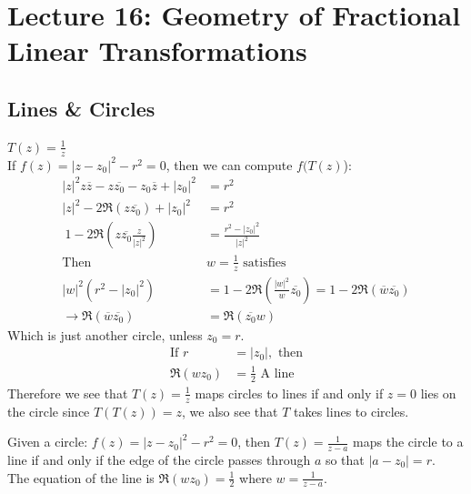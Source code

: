 \chapter{Lecture 16: Geometry of Fractional Linear Transformations}

\section{Lines \& Circles}

\begin{example}
    $T(z) = \frac{1}z$\\
    If $f(z) = |z-z_0|^2 - r^2 = 0$, then we can compute $f(T(z)$):
    \begin{align*}
        |z|^2 z\overline{z} - z\overline{z_0} - z_0\overline{z} + |z_0|^2 & = r^2                                                                            \\
        |z|^2 - 2\Re(z\overline{z_0}) + |z_0|^2                           & = r^2                                                                            \\\
        1 - 2\Re(z\overline{z_0}\frac{z}{|z|^2})                          & = \frac{r^2 - |z_0|^2}{|z|^2}                                                    \\
        \text{Then }                                                      & w = \frac{1}z \text{ satisfies}                                                  \\
        |w|^2(r^2 - |z_0|^2)                                              & = 1 - 2\Re(\frac{|w|^2}{w}\overline{z_0}) = 1 - 2\Re(\overline{w}\overline{z_0}) \\
        \rightarrow \Re(\overline{w}\overline{z_0})                       & = \Re(\overline{z_0}w)\end{align*}
    Which is just another circle, unless $z_0 = r$.
    \begin{align*}
        \text{If } r & = |z_0|, \text{ then}      \\
        \Re(wz_0)    & = \frac{1}2 \text{ A line}
    \end{align*}
    Therefore we see that $T(z) = \frac{1}z$ maps circles to lines if and only if $z = 0$ lies on the circle since $T(T(z)) = z$, we also see that $T$ takes lines to circles.
\end{example}

\begin{proposition}
    Given a circle: $f(z) = |z-z_0|^2 - r^2 = 0$, then $T(z) = \frac{1}{z - a}$ maps the circle to a line if and only if the edge of the circle passes through $a$ so that $|a - z_0| = r$. \\
    The equation of the line is $\Re(wz_0) = \frac{1}2$ where $w = \frac{1}{z - a}$.
\end{proposition}

